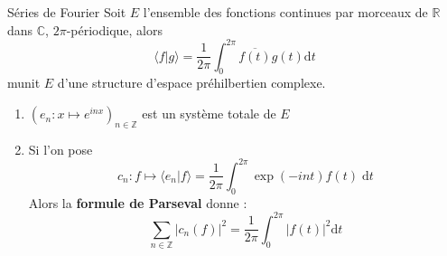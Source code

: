 \begin{Example}{Séries de Fourier}{}
Soit $E$ l'ensemble des fonctions continues par morceaux de $\mathbb{R}$ dans $\mathbb{C}$, $2\pi$-périodique, alors 
\[
  \langle f|g \rangle = \frac{1}{2 \pi } \int_{0 }^{2 \pi}\overline{f(t)} g(t) \mathrm{d } t
\]
munit $E$ d'une structure d'espace préhilbertien complexe.

\begin{enumerate}

    \item $(e_n : x \mapsto e^{inx}) _{n \in \mathbb{Z}}$ est un système totale de $E$

    \item Si l'on pose $$c_n : f \mapsto \langle e_n | f \rangle = \frac{1}{2 \pi } \int_{0 }^{2 \pi } \exp (-int) f(t) \;\mathrm{d } t$$ 
      Alors la \textbf{formule de Parseval} donne :
      \[
        \sum_{n\in \mathbb{Z}}^{} | c_n(f)| ^{2 } = \frac{1}{2\pi } \int_0 ^{2 \pi } | f(t) | ^{2 } \mathrm{d } t
      \]
\end{enumerate}
\end{Example}







